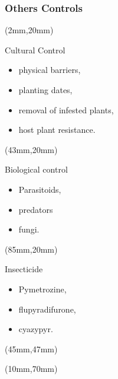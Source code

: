 \documentclass[10pt]{beamer}
\begin{document}
\begin{frame}
\frametitle{Others Controls}
	\begin{textblock*}{40mm}(2mm,20mm)

		\begin{graybox}{Cultural Control}
			\begin{itemize}
				\item<1-> physical barriers,
				\item<2-> planting dates,
				\item<3-> removal of infested plants,
				\item<4-> host plant resistance.
			\end{itemize}
		\end{graybox}
		\end{textblock*}

	\begin{textblock*}{40mm}(43mm,20mm)
		\begin{graybox}{Biological control}
			\begin{itemize}
				\item<5-> Parasitoids,
				\item<6-> predators
				\item<7-> fungi.
			\end{itemize}
		\end{graybox}
	\end{textblock*}

	\begin{textblock*}{42mm}(85mm,20mm)
		\begin{graybox}{Insecticide}
			\begin{itemize}
				\item<8-> Pymetrozine,
				\item<9-> flupyradifurone,
				\item<10-> cyazypyr.
			\end{itemize}
		\end{graybox}
\end{textblock*}

\begin{textblock*}{90mm}(45mm,47mm)	
	\begin{bibunit}[abbrv]
		\nocite{Shun-xiang2001}
		\putbib
	\end{bibunit}
\end{textblock*}

\begin{textblock*}{120mm}(10mm,70mm)
	\begin{bibunit}[abbrv]
		\nocite{Smith2014}
		\putbib
	\end{bibunit}
\end{textblock*}

\end{frame}
\end{document}
